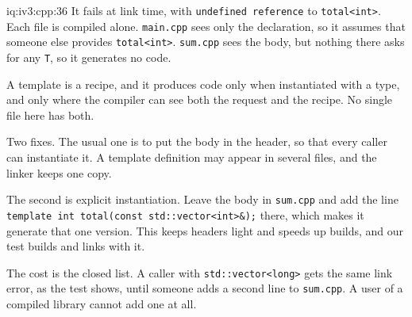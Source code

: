 \begin{solution}{iq:iv3:cpp:36}
It fails at link time, with \texttt{undefined reference} to \texttt{total<int>}. Each file is compiled alone. \texttt{main.cpp} sees only the declaration, so it assumes that someone else provides \texttt{total<int>}. \texttt{sum.cpp} sees the body, but nothing there asks for any \texttt{T}, so it generates no code.

A template is a recipe, and it produces code only when instantiated with a type, and only where the compiler can see both the request and the recipe. No single file here has both.

Two fixes. The usual one is to put the body in the header, so that every caller can instantiate it. A template definition may appear in several files, and the linker keeps one copy.

The second is explicit instantiation. Leave the body in \texttt{sum.cpp} and add the line \texttt{template int total(const std::vector<int>\&);} there, which makes it generate that one version. This keeps headers light and speeds up builds, and our test builds and links with it.

The cost is the closed list. A caller with \texttt{std::vector<long>} gets the same link error, as the test shows, until someone adds a second line to \texttt{sum.cpp}. A user of a compiled library cannot add one at all.

\end{solution}

